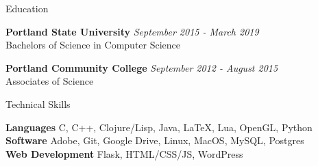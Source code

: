 \documentclass{resume} %
\begin{document}

\begin{rSection}{Education}

{\bf Portland State University} \hfill {\em September 2015 - March 2019} \\
{Bachelors of Science in Computer Science} \hfill {}

{\bf Portland Community College} \hfill {\em September 2012 - August 2015} \\
{Associates of Science} \hfill {}

\end{rSection}


\begin{rSection}{Technical Skills}

{\bf Languages} \hfill {C, C++, Clojure/Lisp, Java, LaTeX, Lua, OpenGL, Python} \\
{\bf Software} \hfill {Adobe, Git, Google Drive, Linux, MacOS, MySQL, Postgres} \\
{\bf Web Development} \hfill {Flask, HTML/CSS/JS, WordPress}

\end{rSection}

\end{document}
